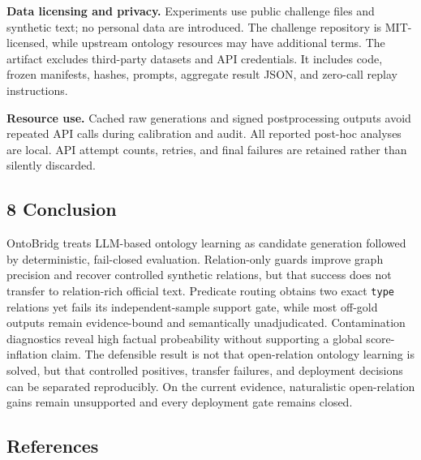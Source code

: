 \documentclass[
]{article}
\begin{document}
\textbf{Data licensing and privacy.} Experiments use public challenge
files and synthetic text; no personal data are introduced. The challenge
repository is MIT-licensed, while upstream ontology resources may have
additional terms. The artifact excludes third-party datasets and API
credentials. It includes code, frozen manifests, hashes, prompts,
aggregate result JSON, and zero-call replay instructions.

\textbf{Resource use.} Cached raw generations and signed postprocessing
outputs avoid repeated API calls during calibration and audit. All
reported post-hoc analyses are local. API attempt counts, retries, and
final failures are retained rather than silently discarded.

\subsection{8 Conclusion}\label{conclusion}

OntoBridg treats LLM-based ontology learning as candidate generation
followed by deterministic, fail-closed evaluation. Relation-only guards
improve graph precision and recover controlled synthetic relations, but
that success does not transfer to relation-rich official text. Predicate
routing obtains two exact \texttt{type} relations yet fails its
independent-sample support gate, while most off-gold outputs remain
evidence-bound and semantically unadjudicated. Contamination diagnostics
reveal high factual probeability without supporting a global
score-inflation claim. The defensible result is not that open-relation
ontology learning is solved, but that controlled positives, transfer
failures, and deployment decisions can be separated reproducibly. On the
current evidence, naturalistic open-relation gains remain unsupported
and every deployment gate remains closed.

\subsection{References}\label{references}
\end{document}
